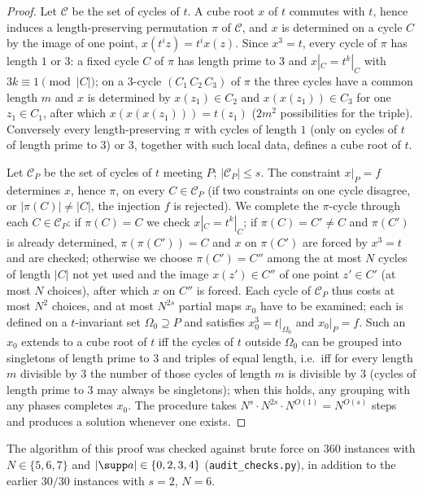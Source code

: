 \begin{thm}
\begin{proof}
Let $\mathcal C$ be the set of cycles of $t$. A cube root $x$ of $t$ commutes with $t$, hence induces a length-preserving permutation
$\pi$ of $\mathcal C$, and $x$ is determined on a cycle $C$ by the image of one point, $x(t^{i}z)=t^{i}x(z)$. Since $x^{3}=t$, every cycle
of $\pi$ has length $1$ or $3$: a fixed cycle $C$ of $\pi$ has length prime to $3$ and $x|_C=t^{k}|_C$ with $3k\equiv1\pmod{|C|}$; on a
$3$-cycle $(C_1\,C_2\,C_3)$ of $\pi$ the three cycles have a common length $m$ and $x$ is determined by $x(z_1)\in C_2$ and $x(x(z_1))\in C_3$
for one $z_1\in C_1$, after which $x(x(x(z_1)))=t(z_1)$ ($2m^{2}$ possibilities for the triple). Conversely every length-preserving $\pi$ with
cycles of length $1$ (only on cycles of $t$ of length prime to $3$) or $3$, together with such local data, defines a cube root of $t$.

Let $\mathcal C_P$ be the set of cycles of $t$ meeting $P$; $|\mathcal C_P|\le s$. The constraint $x|_P=f$ determines $x$, hence $\pi$,
on every $C\in\mathcal C_P$ (if two constraints on one cycle disagree, or $|\pi(C)|\ne|C|$, the injection $f$ is rejected). We complete the
$\pi$-cycle through each $C\in\mathcal C_P$: if $\pi(C)=C$ we check $x|_C=t^{k}|_C$; if $\pi(C)=C'\ne C$ and $\pi(C')$ is already determined,
$\pi(\pi(C'))=C$ and $x$ on $\pi(C')$ are forced by $x^{3}=t$ and are checked; otherwise we choose $\pi(C')=C''$ among the at most $N$ cycles
of length $|C|$ not yet used and the image $x(z')\in C''$ of one point $z'\in C'$ (at most $N$ choices), after which $x$ on $C''$ is forced.
Each cycle of $\mathcal C_P$ thus costs at most $N^{2}$ choices, and at most $N^{2s}$ partial maps $x_0$ have to be examined; each is defined
on a $t$-invariant set $\Omega_0\supseteq P$ and satisfies $x_0^{3}=t|_{\Omega_0}$ and $x_0|_P=f$. Such an $x_0$ extends to a cube root of $t$
iff the cycles of $t$ outside $\Omega_0$ can be grouped into singletons of length prime to $3$ and triples of equal length, i.e.\ iff for
every length $m$ divisible by $3$ the number of those cycles of length $m$ is divisible by $3$ (cycles of length prime to $3$ may always be
singletons); when this holds, any grouping with any phases completes $x_0$. The procedure takes $N^{s}\cdot N^{2s}\cdot N^{O(1)}=N^{O(s)}$
steps and produces a solution whenever one exists.
\end{proof}
The algorithm of this proof was checked against brute force on $360$ instances with $N\in\{5,6,7\}$ and $|\supp a|\in\{0,2,3,4\}$
(\texttt{audit\_checks.py}), in addition to the earlier $30/30$ instances with $s=2$, $N=6$.


\end{thm}
